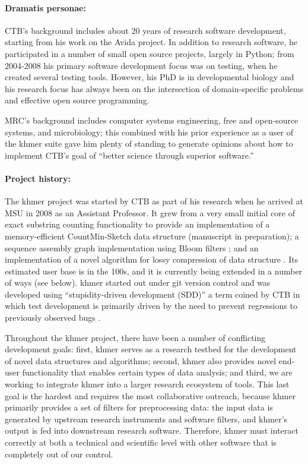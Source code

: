 \documentclass[11pt]{article}
\begin{document}
\paragraph{Dramatis personae:}
CTB's background includes about 20 years of research software development,
starting from his work on the Avida project. \cite{wiki:avida}
\cite{adami1994evolutionary}  In addition to research software, he participated
in a number of small open source projects, largely in Python; from 2004-2008
his primary software development focus was on testing, when he created several
testing tools.  However, his PhD is in developmental biology and his research
focus has always been on the intersection of domain-specific problems and
effective open source programming.

MRC's background includes computer systems engineering, free and open-source
systems, and microbiology; this combined with his prior experience as a user of
the khmer suite gave him plenty of standing to generate opinions about how to
implement CTB's goal of ``better science through superior software.''
\cite{slideshare:cloud-analysis2012}

\paragraph{Project history:}
The khmer project was started by CTB as part of his research when he
arrived at MSU in 2008 as an Assistant Professor.  It grew from a very
small initial core of exact substring counting functionality to
provide an implementation of a memory-efficient CountMin-Sketch data
structure (manuscript in preparation); a sequence assembly graph
implementation using Bloom filters \cite{kmer-percolation}; and an
implementation of a novel algorithm for lossy compression of data
structure \cite{diginorm}.  Its estimated user base is in the 100s,
and it is currently being extended in a number of ways (see below).
khmer started out under git version control and was developed using
``stupidity-driven development (SDD)'' a term coined by CTB in which test
development is primarily driven by the need to prevent regressions to
previously observed bugs \cite{SDD}.

Throughout the khmer project, there have been a number of conflicting
development goals: first, khmer serves as a research testbed for the
development of novel data structures and algorithms; second, khmer
also provides novel end-user functionality that enables certain types
of data analysis; and third, we are working to integrate khmer into a
larger research ecosystem of tools.  This last goal is the hardest
and requires the most collaborative outreach, because khmer
primarily provides a set of filters for preprocessing data: the input
data is generated by upstream research instruments and software
filters, and khmer's output is fed into downstream research software.
Therefore, khmer must interact correctly at both a technical and
scientific level with other software that is completely out of our
control.
\end{document}
